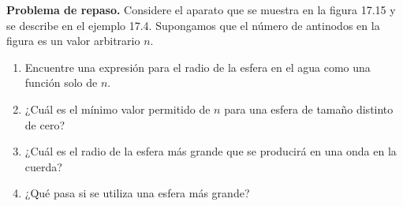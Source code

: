 \item \textbf{Problema de repaso.}
Considere el aparato que se muestra en la figura 17.15 y se describe en el ejemplo 17.4. Supongamos que el número de antinodos en la figura es un valor arbitrario $n$.
\begin{enumerate}
    \item Encuentre una expresión para el radio de la esfera en el agua como una función solo de $n$.
    \item ¿Cuál es el mínimo valor permitido de $n$ para una esfera de tamaño distinto de cero?
    \item ¿Cuál es el radio de la esfera más grande que se producirá en una onda en la cuerda?
    \item ¿Qué pasa si se utiliza una esfera más grande?
\end{enumerate}